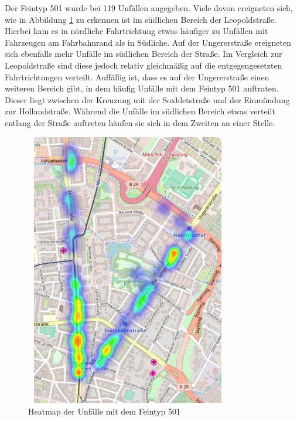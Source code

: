 Der Feintyp 501 wurde bei 119 Unfällen angegeben. Viele davon ereigneten sich, wie in Abbildung \ref{fig:Heatmap_501} zu erkennen ist im südlichen Bereich der Leopoldstraße. Hierbei kam es in nördliche Fahrtrichtung etwas häufiger zu Unfällen mit Fahrzeugen am Fahrbahnrand als in Südliche. Auf der Ungererstraße ereigneten sich ebenfalls mehr Unfälle im südlichen Bereich der Straße. Im Vergleich zur Leopoldstraße sind diese jedoch relativ gleichmäßig auf die entgegengesetzten Fahrtrichtungen verteilt. Auffällig ist, dass es auf der Ungererstraße einen weiteren Bereich gibt, in dem häufig Unfälle mit dem Feintyp 501 auftraten. Dieser liegt zwischen der Kreuzung mit der Soxhletstraße und der Einmündung zur Hollandstraße. Während die Unfälle im südlichen Bereich etwas verteilt entlang der Straße auftreten häufen sie sich in dem Zweiten an einer Stelle.

\begin{savenotes}
	\begin{figure}[H]
		\centering
		\includegraphics[width=9cm,height=12cm]{figures/HM_501}
		\caption[Heatmap der Unfälle mit dem Feintyp 501]{Heatmap der Unfälle mit dem Feintyp 501}\label{fig:Heatmap_501}
	\end{figure}
\end{savenotes}

